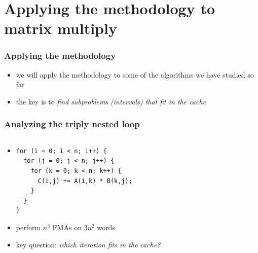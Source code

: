 \documentclass[12pt,dvipdfmx]{beamer}
\newcommand{\ao}[1]{{\color{blue}#1}}
\begin{document}
\section{Applying the methodology to matrix multiply}

\begin{frame}[fragile]
\frametitle{Applying the methodology}
\begin{itemize}

\item we will apply the methodology to some of the 
  algorithms we have studied so far

\item the key is to \ao{\em find subproblems (intervals) that fit in the cache}
\end{itemize}
\end{frame}


\begin{frame}[fragile]
\frametitle{Analyzing the triply nested loop}
\begin{columns}[t]
\begin{column}{0.55\textwidth}
\begin{itemize}
\item []
\begin{lstlisting}
for (i = 0; i < n; i++) {
  for (j = 0; j < n; j++) {
    for (k = 0; k < n; k++) {
      C(i,j) += A(i,k) * B(k,j);
    }
  }
}
\end{lstlisting}
\item perform \ao{$n^3$} FMAs on \ao{$3n^2$} words
\item key question:
  \ao{\emph{which iteration fits in the cache?}}
\end{itemize}
\end{column}

\begin{column}{0.45\textwidth}
\begin{center}
\def\svgwidth{0.9\textwidth}
{\tiny }
\end{center}
\end{column}
\end{columns}
\end{frame}
\end{document}
